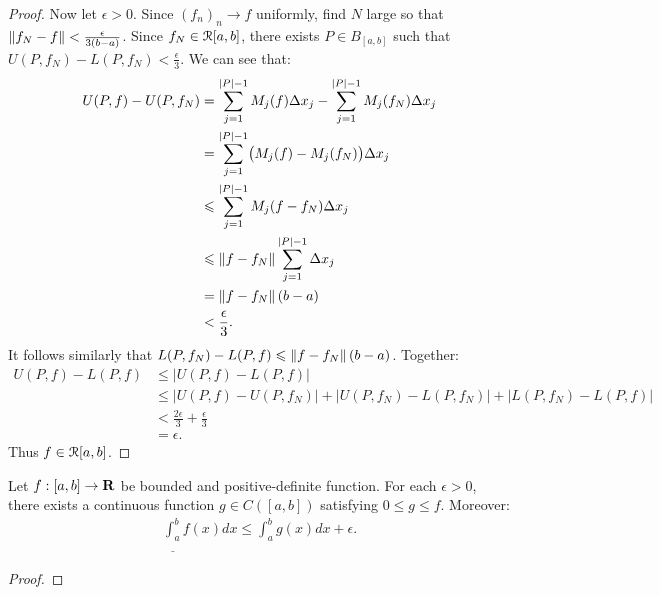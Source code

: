 \documentclass[10pt,twoside,openany]{memoir}
\begin{document}
\begin{proof}
            Now let $\epsilon > 0$. Since $(f_n)_n \rightarrow f$ uniformly, find $N$ large so that $\left\lVert f_N - f \right\rVert < \frac{\epsilon}{3(b-a)}$. Since $f_N \in \mathcal{R}[a,b]$, there exists $P \in B_{[a,b]}$ such that $U(P,f_N) - L(P,f_N) < \frac{\epsilon}{3}$. We can see that:
                \begin{equation*}
                \begin{split}
                    U(P,f) - U(P,f_N)
                    & = \sum_{j = 1}^{|P| - 1}M_j(f)\Delta x_j - \sum_{j = 1}^{|P| - 1}M_j(f_N)\Delta x_j \\
                    & = \sum_{j = 1}^{|P| - 1} \bigl(M_j(f) - M_j(f_N)\bigr)\Delta x_j \\
                    & \leqslant \sum_{j = 1}^{|P| - 1} M_j(f - f_N)\Delta x_j \\
                    & \leqslant \left\lVert f - f_N \right\rVert\sum_{j = 1}^{|P| - 1} \Delta x_j \\
                    & = \left\lVert f - f_N \right\rVert(b-a) \\
                    & < \frac{\epsilon}{3}.
                \end{split}
                \end{equation*}
            It follows similarly that $L(P,f_N) - L(P,f) \leqslant \left\lVert f - f_N \right\rVert(b-a)$. Together:
                \begin{equation*}
                \begin{split}
                    U(P,f) - L(P,f)
                    & \leq |U(P,f) - L(P,f)| \\
                    & \leq |U(P,f) - U(P,f_N)| + |U(P,f_N) - L(P,f_N)| + |L(P,f_N) - L(P,f)| \\
                    & < \frac{2\epsilon}{3} + \frac{\epsilon}{3} \\
                    & = \epsilon.
                \end{split}
                \end{equation*}
            Thus $f \in \mathcal{R}[a,b]$.
        \end{proof}

    \begin{lemma}
        Let $f:[a,b] \rightarrow \mathbf{R}$ be bounded and positive-definite function. For each $\epsilon > 0$, there exists a continuous function $g \in C([a,b])$ satisfying $0 \leq g \leq f$. Moreover:
            \begin{equation*}
            \begin{split}
                \underline{\int_a^b}f(x)dx \leq \int_a^bg(x)dx + \epsilon.
            \end{split}
            \end{equation*}
            \begin{proof}
                
            \end{proof}
    \end{lemma}

    
\end{document}
